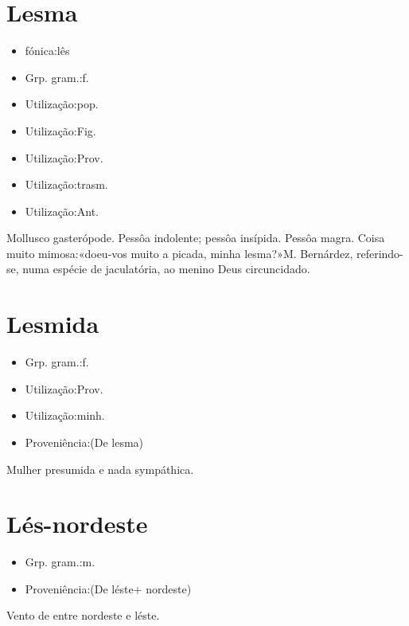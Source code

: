 \section{Lesma}
\begin{itemize}
\item {fónica:lês}
\end{itemize}
\begin{itemize}
\item {Grp. gram.:f.}
\end{itemize}
\begin{itemize}
\item {Utilização:pop.}
\end{itemize}
\begin{itemize}
\item {Utilização:Fig.}
\end{itemize}
\begin{itemize}
\item {Utilização:Prov.}
\end{itemize}
\begin{itemize}
\item {Utilização:trasm.}
\end{itemize}
\begin{itemize}
\item {Utilização:Ant.}
\end{itemize}
Mollusco gasterópode.
Pessôa indolente; pessôa insípida.
Pessôa magra.
Coisa muito mimosa:«\textunderscore doeu-vos muito a picada, minha lesma?\textunderscore »M. Bernárdez, referindo-se, numa espécie de jaculatória, ao menino Deus circuncidado.
\section{Lesmida}
\begin{itemize}
\item {Grp. gram.:f.}
\end{itemize}
\begin{itemize}
\item {Utilização:Prov.}
\end{itemize}
\begin{itemize}
\item {Utilização:minh.}
\end{itemize}
\begin{itemize}
\item {Proveniência:(De \textunderscore lesma\textunderscore )}
\end{itemize}
Mulher presumida e nada sympáthica.
\section{Lés-nordeste}
\begin{itemize}
\item {Grp. gram.:m.}
\end{itemize}
\begin{itemize}
\item {Proveniência:(De \textunderscore léste\textunderscore  + \textunderscore nordeste\textunderscore )}
\end{itemize}
Vento de entre nordeste e léste.
